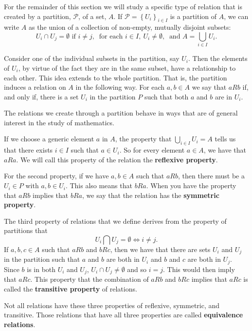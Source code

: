 \documentclass[
]{book}
\theoremstyle{definition}
\theoremstyle{definition}
\theoremstyle{definition}
\theoremstyle{definition}
\theoremstyle{remark}
\begin{document}
For the remainder of this section we will study a specific type of relation that is created by a partition, \(\mathcal{P}\), of a set, \(A\). If \(\mathcal{P}=\left\{U_i\right\}_{i\in I}\) is a partition of \(A\), we can write \(A\) as the union of a collection of non-empty, mutually disjoint subsets: \[U_i \cap U_j = \emptyset \mbox{ if } i\neq j, \: \mbox{ for each } i \in I, \: U_i\neq \emptyset, \: \mbox{ and } A=\bigcup_{i\in I} U_i.\]

Consider one of the individual subsets in the partition, say \(U_i\). Then the elements of \(U_i\), by virtue of the fact they are in the same subset, have a relationship to each other. This idea extends to the whole partition. That is, the partition induces a relation on \(A\) in the following way. For each \(a,b\in A\) we say that \(aRb\) if, and only if, there is a set \(U_i\) in the partition \(P\) such that both \(a\) and \(b\) are in \(U_i\).

The relations we create through a partition behave in ways that are of general interest in the study of mathematics.

If we choose a generic element \(a\) in \(A\), the property that \(\bigcup_{i\in I} U_i = A\) tells us that there exists \(i\in I\) such that \(a \in U_i\). So for every element \(a\in A\), we have that \(aRa\). We will call this property of the relation the \textbf{reflexive property}.

For the second property, if we have \(a,b\in A\) such that \(aRb\), then there must be a \(U_i\in P\) with \(a,b\in U_i\). This also means that \(bRa\). When you have the property that \(aRb\) implies that \(bRa\), we say that the relation has the \textbf{symmetric property}.

The third property of relations that we define derives from the property of partitions that
\[U_i \bigcap U_j = \emptyset \Leftrightarrow i\neq j.\] If \(a,b,c\in A\) such that \(aRb\) and \(bRc\), then we have that there are sets \(U_i\) and \(U_j\) in the partition such that \(a\) and \(b\) are both in \(U_i\) and \(b\) and \(c\) are both in \(U_j\). Since \(b\) is in both \(U_i\) and \(U_j\), \(U_i \cap U_j \neq \emptyset\) and so \(i=j\). This would then imply that \(aRc\). This property that the combination of \(aRb\) and \(bRc\) implies that \(aRc\) is called the \textbf{transitive property} of relations.

Not all relations have these three properties of reflexive, symmetric, and transitive. Those relations that have all three properties are called \textbf{equivalence relations}.
\end{document}
